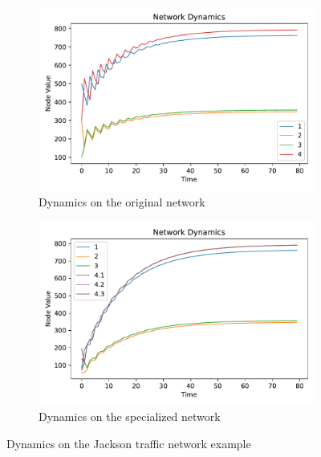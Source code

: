 \documentclass[12pt]{thesis}
\begin{document}
\begin{figure}
    \centering
    \begin{subfigure}[b]{0.45\textwidth}
        \centering
        \includegraphics[width=\textwidth]{images/jackson_network_1.pdf}
        \caption{Dynamics on the original network}
        \label{fig:jackson_network_1}
    \end{subfigure}
    \hfill
    \begin{subfigure}[b]{0.45\textwidth}
        \centering
        \includegraphics[width=\textwidth]{images/jackson_network_2.pdf}
        \caption{Dynamics on the specialized network}
        \label{fig:jackson_network_2}
    \end{subfigure}
    \hfill
       \caption{Dynamics on the Jackson traffic network example}
       \label{fig:jackson_network}
\end{figure}
\end{document}
